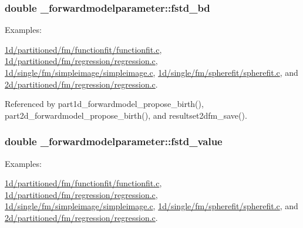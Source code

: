\subsubsection[{\texorpdfstring{fstd\+\_\+bd}{fstd_bd}}]{\setlength{\rightskip}{0pt plus 5cm}double \+\_\+forwardmodelparameter\+::fstd\+\_\+bd}\hypertarget{struct__forwardmodelparameter_a7afd8319a9bf822ab7999ea8a52be0ed}{}\label{struct__forwardmodelparameter_a7afd8319a9bf822ab7999ea8a52be0ed}
\begin{Desc}
\item[Examples\+: ]\par
\hyperlink{1d_2partitioned_2fm_2functionfit_2functionfit_8c-example}{1d/partitioned/fm/functionfit/functionfit.\+c}, \hyperlink{1d_2partitioned_2fm_2regression_2regression_8c-example}{1d/partitioned/fm/regression/regression.\+c}, \hyperlink{1d_2single_2fm_2simpleimage_2simpleimage_8c-example}{1d/single/fm/simpleimage/simpleimage.\+c}, \hyperlink{1d_2single_2fm_2spherefit_2spherefit_8c-example}{1d/single/fm/spherefit/spherefit.\+c}, and \hyperlink{2d_2partitioned_2fm_2regression_2regression_8c-example}{2d/partitioned/fm/regression/regression.\+c}.\end{Desc}


Referenced by part1d\+\_\+forwardmodel\+\_\+propose\+\_\+birth(), part2d\+\_\+forwardmodel\+\_\+propose\+\_\+birth(), and resultset2dfm\+\_\+save().

\subsubsection[{\texorpdfstring{fstd\+\_\+value}{fstd_value}}]{\setlength{\rightskip}{0pt plus 5cm}double \+\_\+forwardmodelparameter\+::fstd\+\_\+value}\hypertarget{struct__forwardmodelparameter_a08b65584a090a79dce5dc91aaced7bbe}{}\label{struct__forwardmodelparameter_a08b65584a090a79dce5dc91aaced7bbe}
\begin{Desc}
\item[Examples\+: ]\par
\hyperlink{1d_2partitioned_2fm_2functionfit_2functionfit_8c-example}{1d/partitioned/fm/functionfit/functionfit.\+c}, \hyperlink{1d_2partitioned_2fm_2regression_2regression_8c-example}{1d/partitioned/fm/regression/regression.\+c}, \hyperlink{1d_2single_2fm_2simpleimage_2simpleimage_8c-example}{1d/single/fm/simpleimage/simpleimage.\+c}, \hyperlink{1d_2single_2fm_2spherefit_2spherefit_8c-example}{1d/single/fm/spherefit/spherefit.\+c}, and \hyperlink{2d_2partitioned_2fm_2regression_2regression_8c-example}{2d/partitioned/fm/regression/regression.\+c}.\end{Desc}


